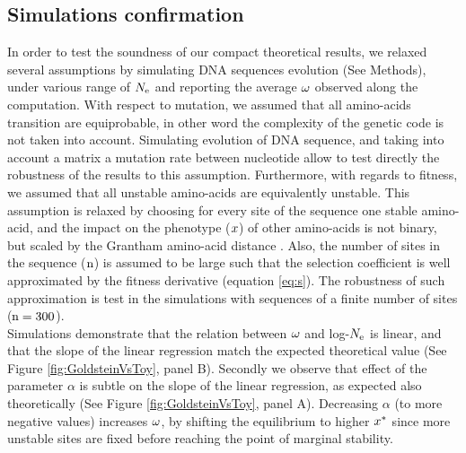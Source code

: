 \documentclass{article}
\begin{document}
\subsection*{Simulations confirmation}
In order to test the soundness of our compact theoretical results, we relaxed several assumptions by simulating DNA sequences evolution (See Methods), under various range of $N_{\mathrm{e}}$ and reporting the average $\omega$ observed along the computation. 
With respect to mutation, we assumed that all amino-acids transition are equiprobable, in other word the complexity of the genetic code is not taken into account.
Simulating evolution of DNA sequence, and taking into account a matrix a mutation rate between nucleotide allow to test directly the robustness of the results to this assumption.
Furthermore, with regards to fitness, we assumed that all unstable amino-acids are equivalently unstable.
This assumption is relaxed by choosing for every site of the sequence one stable amino-acid, and the impact on the phenotype ($x$) of other amino-acids is not binary, but scaled by the Grantham amino-acid distance \cite{Grantham1974}.
Also, the number of sites in the sequence ($\text{n}$) is assumed to be large such that the selection coefficient is well approximated by the fitness derivative (equation \ref{eq:s}).
The robustness of such approximation is test in the simulations with sequences of a finite number of sites ($\text{n}=300$).\\

Simulations demonstrate that the relation between $\omega$ and log-$N_{\mathrm{e}}$ is linear, and that the slope of the linear regression match the expected theoretical value (See Figure \ref{fig:GoldsteinVsToy}, panel B).
Secondly we observe that effect of the parameter $\alpha$ is subtle on the slope of the linear regression, as expected also theoretically (See Figure \ref{fig:GoldsteinVsToy}, panel A).
Decreasing $\alpha$ (to more negative values) increases $\omega$, by shifting the equilibrium to higher $x^{*}$ since more unstable sites are fixed before reaching the point of marginal stability.\\
\end{document}
